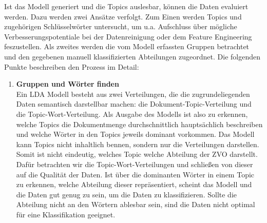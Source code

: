 \documentclass[german,version-2020-11]{uzl-thesis}
\begin{document}
Ist das Modell generiert und die Topics auslesbar, können die Daten evaluiert werden. Dazu werden zwei Ansätze verfolgt. Zum Einen werden Topics und zugehörigen Schlüsselwörter untersucht, um u.a. Aufschluss über mögliche Verbesserungspotentiale bei der Datenreinigung oder dem Feature Engineering feszustellen. Als zweites werden die vom Modell erfassten Gruppen betrachtet und den gegebenen manuell klassifizierten Abteilungen zugeordnet. Die folgenden Punkte beschreiben den Prozess im Detail: \\

\begin{enumerate}
\item \textbf{Gruppen und Wörter finden}\\
Ein LDA Modell besteht aus zwei Verteilungen, die die zugrundeliegenden Daten semantisch darstellbar machen: die Dokument-Topic-Verteilung und die Topic-Wort-Verteilung. Als Ausgabe des Modells ist also zu erkennen, welche Topics die Dokumentmenge durchschnittlich hauptsächlich beschreiben und welche Wörter in den Topics jeweils dominant vorkommen. Das Modell kann Topics nicht inhaltlich bennen, sondern nur die Verteilungen darstellen. Somit ist nicht eindeutig, welches Topic welche Abteilung der ZVO darstellt. Dafür betrachten wir die Topic-Wort-Verteilungen und schließen von dieser auf die Qualität der Daten. Ist über die dominanten Wörter in einem Topic zu erkennen, welche Abteilung dieser repräsentiert, scheint das Modell und die Daten gut genug zu sein, um die Daten zu klassifizieren. Sollte die Abteilung nicht an den Wörtern ablesbar sein, sind die Daten nicht optimal für eine Klassifikation geeignet. 


\end{enumerate}
\end{document}

